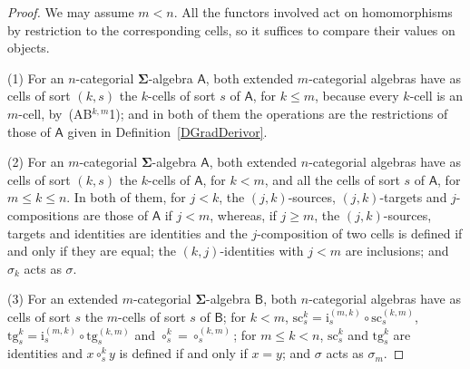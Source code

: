 \documentclass{amsart}
\theoremstyle{plain}
\theoremstyle{definition}
\begin{document}
\begin{proof}
We may assume $m<n$. All the functors involved act on homomorphisms by restriction to the corresponding cells, so it suffices to compare their values on objects.

(1) For an $n$-categorial $\mathbf{\Sigma}$-algebra $\boldsymbol{\mathsf{A}}$, both extended $m$-categorial algebras have as cells of sort $(k,s)$ the $k$-cells of sort $s$ of $\boldsymbol{\mathsf{A}}$, for $k\leq m$, because every $k$-cell is an $m$-cell, by~(AB$^{k,m}$1); and in both of them the operations are the restrictions of those of $\boldsymbol{\mathsf{A}}$ given in Definition~\ref{DGradDerivor}.

(2) For an $m$-categorial $\mathbf{\Sigma}$-algebra $\boldsymbol{\mathsf{A}}$, both extended $n$-categorial algebras have as cells of sort $(k,s)$ the $k$-cells of $\boldsymbol{\mathsf{A}}$, for $k<m$, and all the cells of sort $s$ of $\boldsymbol{\mathsf{A}}$, for $m\leq k\leq n$. In both of them, for $j<k$, the $(j,k)$-sources, $(j,k)$-targets and $j$-compositions are those of $\boldsymbol{\mathsf{A}}$ if $j<m$, whereas, if $j\geq m$, the $(j,k)$-sources, targets and identities are identities and the $j$-composition of two cells is defined if and only if they are equal; the $(k,j)$-identities with $j<m$ are inclusions; and $\sigma_{k}$ acts as $\sigma$.

(3) For an extended $m$-categorial $\mathbf{\Sigma}$-algebra $\boldsymbol{\mathsf{B}}$, both $n$-categorial algebras have as cells of sort $s$ the $m$-cells of sort $s$ of $\boldsymbol{\mathsf{B}}$; for $k<m$, $\mathrm{sc}^{k}_{s}=\mathrm{i}^{(m,k)}_{s}\circ\mathrm{sc}^{(k,m)}_{s}$, $\mathrm{tg}^{k}_{s}=\mathrm{i}^{(m,k)}_{s}\circ\mathrm{tg}^{(k,m)}_{s}$ and $\circ^{k}_{s}=\circ^{(k,m)}_{s}$; for $m\leq k<n$, $\mathrm{sc}^{k}_{s}$ and $\mathrm{tg}^{k}_{s}$ are identities and $x\circ^{k}_{s}y$ is defined if and only if $x=y$; and $\sigma$ acts as $\sigma_{m}$.


\end{proof}
\end{document}
